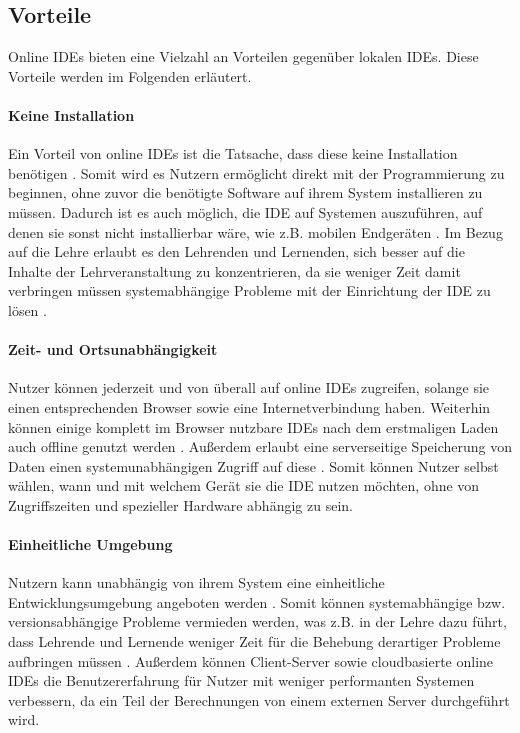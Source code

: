 \subsection{Vorteile}\label{section:stand-der-technik:literaturrecherche:vorteile}

Online IDEs bieten eine Vielzahl an Vorteilen gegenüber lokalen IDEs. Diese Vorteile werden im Folgenden erläutert.

\paragraph{Keine Installation}
Ein Vorteil von online IDEs ist die Tatsache, dass diese keine Installation benötigen \cite{srinivasa_bad_2022}\cite{tran_interactive_2013}\cite{yang_evaluations_2018}. Somit wird es Nutzern ermöglicht direkt mit der Programmierung zu beginnen, ohne zuvor die benötigte Software auf ihrem System installieren zu müssen. Dadurch ist es auch möglich, die IDE auf Systemen auszuführen, auf denen sie sonst nicht installierbar wäre, wie z.B. mobilen Endgeräten \cite{jefferson_pyodideu_2024}\cite{ball_beyond_2015}\cite{uehara_javascript_2019}. Im Bezug auf die Lehre erlaubt es den Lehrenden und Lernenden, sich besser auf die Inhalte der Lehrveranstaltung zu konzentrieren, da sie weniger Zeit damit verbringen müssen systemabhängige Probleme mit der Einrichtung der IDE zu lösen \cite{valez_student_2020}.

\paragraph{Zeit- und Ortsunabhängigkeit}
Nutzer können jederzeit und von überall auf online IDEs zugreifen, solange sie einen entsprechenden Browser sowie eine Internetverbindung haben. Weiterhin können einige komplett im Browser nutzbare IDEs nach dem erstmaligen Laden auch offline genutzt werden \cite{jefferson_pyodideu_2024}. Außerdem erlaubt eine serverseitige Speicherung von Daten einen systemunabhängigen Zugriff auf diese \cite{ball_beyond_2015}. Somit können Nutzer selbst wählen, wann und mit welchem Gerät sie die IDE nutzen möchten, ohne von Zugriffszeiten und spezieller Hardware abhängig zu sein.

\paragraph{Einheitliche Umgebung}
Nutzern kann unabhängig von ihrem System eine einheitliche Entwicklungsumgebung angeboten werden \cite{molnar_evaluation_2023}\cite{tran_interactive_2013}. Somit können systemabhängige bzw. versionsabhängige Probleme vermieden werden, was z.B. in der Lehre dazu führt, dass Lehrende und Lernende weniger Zeit für die Behebung derartiger Probleme aufbringen müssen \cite{valez_student_2020}. Außerdem können Client-Server sowie cloudbasierte online IDEs die Benutzererfahrung für Nutzer mit weniger performanten Systemen verbessern, da ein Teil der Berechnungen von einem externen Server durchgeführt wird.

